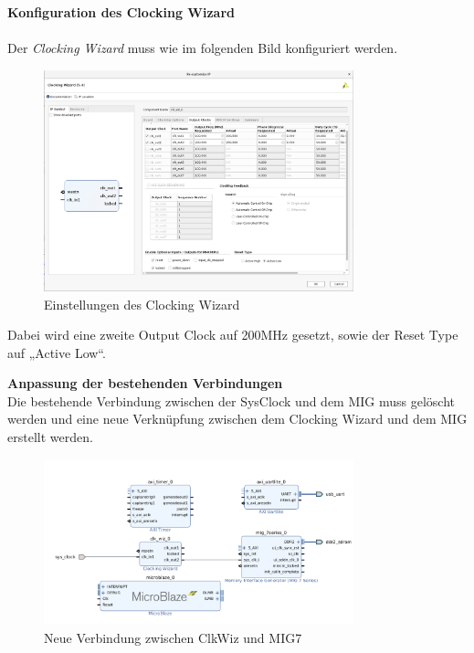 \newpage
\textbf{Konfiguration des Clocking Wizard}\\\\
Der \emph{Clocking Wizard} muss wie im folgenden Bild konfiguriert werden.\\

\vspace{10mm}

\begin{figure}[H]
\centering
\includegraphics[width=0.8\textwidth]{Hauptteil/Schritt5.png}
\caption{Einstellungen des Clocking Wizard}\label{fig:mbschritt5}
\end{figure}

\vspace{10mm}

Dabei wird eine zweite Output Clock auf 200MHz gesetzt, sowie der Reset Type auf „Active Low“.\\

\newpage

\textbf{Anpassung der bestehenden Verbindungen}\\

Die bestehende Verbindung zwischen der SysClock und dem MIG muss gelöscht werden und eine neue Verknüpfung zwischen dem Clocking Wizard und dem MIG erstellt werden.\\

\begin{figure}[H]
\centering
\includegraphics[width=0.8\textwidth]{Hauptteil/schritt6.png}
\caption{Neue Verbindung zwischen ClkWiz und MIG7}\label{fig:mbschritt6}
\end{figure}

